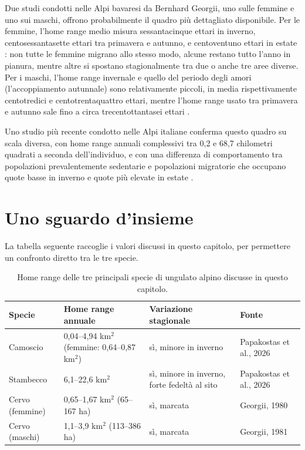 Due studi condotti nelle Alpi bavaresi da Bernhard Georgii, uno sulle femmine e uno sui maschi, offrono probabilmente il quadro più dettagliato disponibile. Per le femmine, l'home range medio misura sessantacinque ettari in inverno, centosessantasette ettari tra primavera e autunno, e centoventuno ettari in estate \citep{georgii1980a}: non tutte le femmine migrano allo stesso modo, alcune restano tutto l'anno in pianura, mentre altre si spostano stagionalmente tra due o anche tre aree diverse. Per i maschi, l'home range invernale e quello del periodo degli amori (l'accoppiamento autunnale) sono relativamente piccoli, in media rispettivamente centotredici e centotrentaquattro ettari, mentre l'home range usato tra primavera e autunno sale fino a circa trecentottantasei ettari \citep{georgii1981}.

Uno studio più recente condotto nelle Alpi italiane conferma questo quadro su scala diversa, con home range annuali complessivi tra 0,2 e 68,7 chilometri quadrati a seconda dell'individuo, e con una differenza di comportamento tra popolazioni prevalentemente sedentarie e popolazioni migratorie che occupano quote basse in inverno e quote più elevate in estate \citep{luccarini2006}.

\section{Uno sguardo d'insieme}

La tabella seguente raccoglie i valori discussi in questo capitolo, per permettere un confronto diretto tra le tre specie.

\begin{table}[htbp]
\centering
\small
\begin{tabular}{@{}p{2.6cm}p{3.6cm}p{2.2cm}p{2.6cm}@{}}
\toprule
\textbf{Specie} & \textbf{Home range annuale} & \textbf{Variazione stagionale} & \textbf{Fonte} \\
\midrule
Camoscio & 0,04--4,94 km$^2$ (femmine: 0,64--0,87 km$^2$) & sì, minore in inverno & Papakostas et al., 2026 \\
Stambecco & 6,1--22,6 km$^2$ & sì, minore in inverno, forte fedeltà al sito & Papakostas et al., 2026 \\
Cervo (femmine) & 0,65--1,67 km$^2$ (65--167 ha) & sì, marcata & Georgii, 1980 \\
Cervo (maschi) & 1,1--3,9 km$^2$ (113--386 ha) & sì, marcata & Georgii, 1981 \\
\bottomrule
\end{tabular}
\caption{Home range delle tre principali specie di ungulato alpino discusse in questo capitolo.}
\label{tab:home_range}
\end{table}

